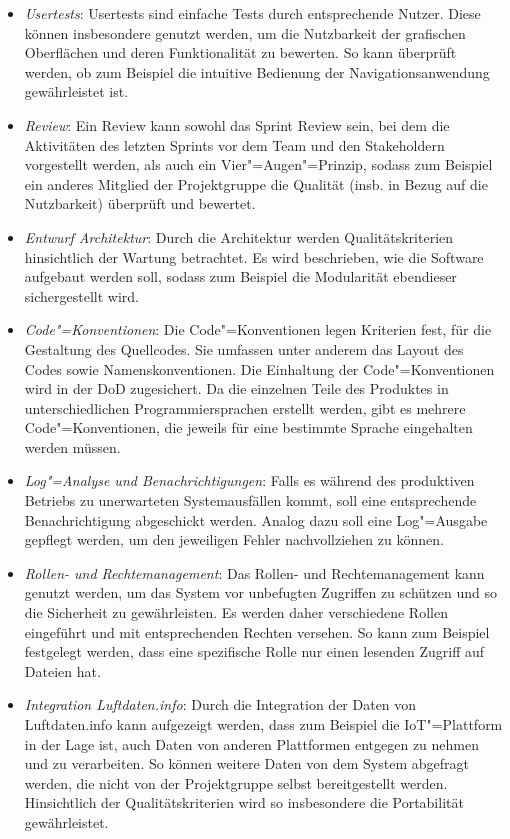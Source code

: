 \begin{itemize}
    \item	\textit{Usertests}: Usertests sind einfache Tests durch entsprechende Nutzer. Diese können insbesondere genutzt werden, um die Nutzbarkeit der grafischen Oberflächen und deren Funktionalität zu bewerten. So kann überprüft werden, ob zum Beispiel die intuitive Bedienung der Navigationsanwendung gewährleistet ist.
    \item	\textit{Review}: Ein Review kann sowohl das Sprint Review sein, bei dem die Aktivitäten des letzten Sprints vor dem Team und den Stakeholdern vorgestellt werden, als auch ein Vier"=Augen"=Prinzip, sodass zum Beispiel ein anderes Mitglied der Projektgruppe die Qualität (insb. in Bezug auf die Nutzbarkeit) überprüft und bewertet.
    \item	\textit{Entwurf Architektur}: Durch die Architektur werden Qualitätskriterien hinsichtlich der Wartung betrachtet. Es wird beschrieben, wie die Software aufgebaut werden soll, sodass zum Beispiel die Modularität ebendieser sichergestellt wird.
    \item	\textit{Code"=Konventionen}: Die Code"=Konventionen legen Kriterien fest, für die Gestaltung des Quellcodes. Sie umfassen unter anderem das Layout des Codes sowie Namenskonventionen. Die Einhaltung der Code"=Konventionen wird in der DoD zugesichert. Da die einzelnen Teile des Produktes in unterschiedlichen Programmiersprachen erstellt werden, gibt es mehrere Code"=Konventionen, die jeweils für eine bestimmte Sprache eingehalten werden müssen.
    \item	\textit{Log"=Analyse und Benachrichtigungen}: Falls es während des produktiven Betriebs zu unerwarteten Systemausfällen kommt, soll eine entsprechende Benachrichtigung abgeschickt werden. Analog dazu soll eine Log"=Ausgabe gepflegt werden, um den jeweiligen Fehler nachvollziehen zu können.
    \item   \textit{Rollen- und Rechtemanagement}: Das Rollen- und Rechtemanagement kann genutzt werden, um das System vor unbefugten Zugriffen zu schützen und so die Sicherheit zu gewährleisten. Es werden daher verschiedene Rollen eingeführt und mit entsprechenden Rechten versehen. So kann zum Beispiel festgelegt werden, dass eine spezifische Rolle nur einen lesenden Zugriff auf Dateien hat.
    \item	\textit{Integration Luftdaten.info}: Durch die Integration der Daten von Luftdaten.info kann aufgezeigt werden, dass zum Beispiel die IoT"=Plattform in der Lage ist, auch Daten von anderen Plattformen entgegen zu nehmen und zu verarbeiten. So können weitere Daten von dem System abgefragt werden, die nicht von der Projektgruppe selbst bereitgestellt werden. Hinsichtlich der Qualitätskriterien wird so insbesondere die Portabilität gewährleistet.

\end{itemize}
